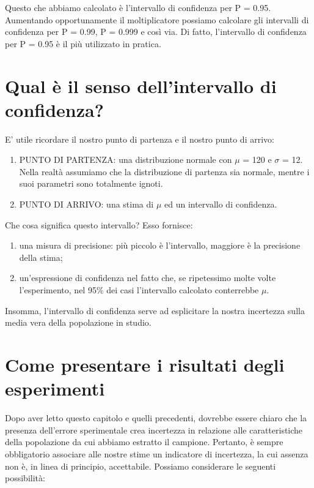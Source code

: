 \documentclass[a4paper,12pt,oneside]{book}
\providecommand{\tightlist}{%
  \setlength{\itemsep}{0pt}\setlength{\parskip}{0pt}}
\begin{document}
Questo che abbiamo calcolato è l'intervallo di confidenza per P = 0.95. Aumentando opportunamente il moltiplicatore possiamo calcolare gli intervalli di confidenza per P = 0.99, P = 0.999 e così via. Di fatto, l'intervallo di confidenza per P = 0.95 è il più utilizzato in pratica.

\hypertarget{qual-e-il-senso-dellintervallo-di-confidenza}{%
\section{Qual è il senso dell'intervallo di confidenza?}\label{qual-e-il-senso-dellintervallo-di-confidenza}}

E' utile ricordare il nostro punto di partenza e il nostro punto di arrivo:

\begin{enumerate}
\def\labelenumi{\arabic{enumi}.}
\tightlist
\item
  PUNTO DI PARTENZA: una distribuzione normale con \(\mu\) = 120 e \(\sigma\) = 12. Nella realtà assumiamo che la distribuzione di partenza sia normale, mentre i suoi parametri sono totalmente ignoti.
\item
  PUNTO DI ARRIVO: una stima di \(\mu\) ed un intervallo di confidenza.
\end{enumerate}

Che cosa significa questo intervallo? Esso fornisce:

\begin{enumerate}
\def\labelenumi{\arabic{enumi}.}
\tightlist
\item
  una misura di precisione: più piccolo è l'intervallo, maggiore è la precisione della stima;
\item
  un'espressione di confidenza nel fatto che, se ripetessimo molte volte l'esperimento, nel 95\% dei casi l'intervallo calcolato conterrebbe \(\mu\).
\end{enumerate}

Insomma, l'intervallo di confidenza serve ad esplicitare la nostra incertezza sulla media vera della popolazione in studio.

\hypertarget{come-presentare-i-risultati-degli-esperimenti}{%
\section{Come presentare i risultati degli esperimenti}\label{come-presentare-i-risultati-degli-esperimenti}}

Dopo aver letto questo capitolo e quelli precedenti, dovrebbe essere chiaro che la presenza dell'errore sperimentale crea incertezza in relazione alle caratteristiche della popolazione da cui abbiamo estratto il campione. Pertanto, è sempre obbligatorio associare alle nostre stime un indicatore di incertezza, la cui assenza non è, in linea di principio, accettabile. Possiamo considerare le seguenti possibilità:
\end{document}
